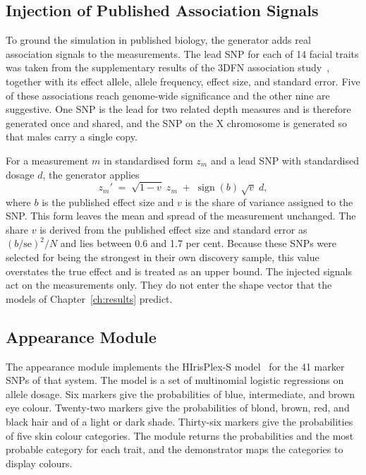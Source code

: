 \subsection{Injection of Published Association Signals}
\label{sec:impl-inject}
To ground the simulation in published biology, the generator adds real association signals to the measurements. The lead SNP for each of 14 facial traits was taken from the supplementary results of the 3DFN association study~\cite{ref:shaffer}, together with its effect allele, allele frequency, effect size, and standard error. Five of these associations reach genome-wide significance and the other nine are suggestive. One SNP is the lead for two related depth measures and is therefore generated once and shared, and the SNP on the X chromosome is generated so that males carry a single copy.

For a measurement $m$ in standardised form $z_m$ and a lead SNP with standardised dosage $d$, the generator applies
\begin{equation}\label{eq:inject}
z_m' \;=\; \sqrt{1-v}\;z_m \;+\; \operatorname{sign}(b)\,\sqrt{v}\;d ,
\end{equation}
where $b$ is the published effect size and $v$ is the share of variance assigned to the SNP. This form leaves the mean and spread of the measurement unchanged. The share $v$ is derived from the published effect size and standard error as $(b/\mathrm{se})^2/N$ and lies between 0.6 and 1.7 per cent. Because these SNPs were selected for being the strongest in their own discovery sample, this value overstates the true effect and is treated as an upper bound. The injected signals act on the measurements only. They do not enter the shape vector that the models of Chapter~\ref{ch:results} predict.

\subsection{Appearance Module}
\label{sec:impl-appearance}
The appearance module implements the HIrisPlex-S model~\cite{ref:hirisplex,ref:hirisplexs} for the 41 marker SNPs of that system. The model is a set of multinomial logistic regressions on allele dosage. Six markers give the probabilities of blue, intermediate, and brown eye colour. Twenty-two markers give the probabilities of blond, brown, red, and black hair and of a light or dark shade. Thirty-six markers give the probabilities of five skin colour categories. The module returns the probabilities and the most probable category for each trait, and the demonstrator maps the categories to display colours.

